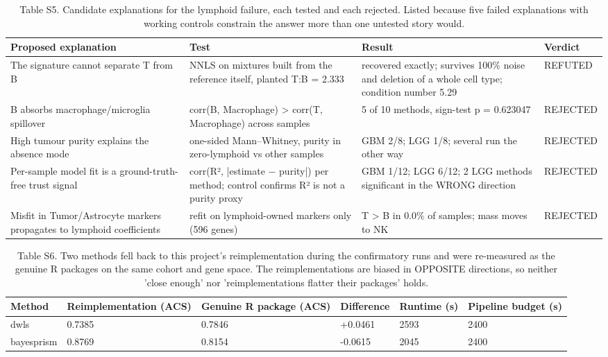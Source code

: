 \begin{table}[htbp]
\centering
\small
\caption{Table S5. Candidate explanations for the lymphoid failure, each tested and each rejected. Listed because five failed explanations with working controls constrain the answer more than one untested story would.}
\label{tab:S5_rejected_mechanisms}
\begin{tabular}{llll}
\toprule
\textbf{Proposed explanation} & \textbf{Test} & \textbf{Result} & \textbf{Verdict} \\
\midrule
The signature cannot separate T from B & NNLS on mixtures built from the reference itself, planted T:B = 2.333 & recovered exactly; survives 100\% noise and deletion of a whole cell type; condition number 5.29 & REFUTED \\
B absorbs macrophage/microglia spillover & corr(B, Macrophage) > corr(T, Macrophage) across samples & 5 of 10 methods, sign-test p = 0.623047 & REJECTED \\
High tumour purity explains the absence mode & one-sided Mann–Whitney, purity in zero-lymphoid vs other samples & GBM 2/8; LGG 1/8; several run the other way & REJECTED \\
Per-sample model fit is a ground-truth-free trust signal & corr(R², |estimate − purity|) per method; control confirms R² is not a purity proxy & GBM 1/12; LGG 6/12; 2 LGG methods significant in the WRONG direction & REJECTED \\
Misfit in Tumor/Astrocyte markers propagates to lymphoid coefficients & refit on lymphoid-owned markers only (596 genes) & T > B in 0.0\% of samples; mass moves to NK & REJECTED \\
\bottomrule
\end{tabular}
\end{table}

\begin{table}[htbp]
\centering
\small
\caption{Table S6. Two methods fell back to this project's reimplementation during the confirmatory runs and were re-measured as the genuine R packages on the same cohort and gene space. The reimplementations are biased in OPPOSITE directions, so neither 'close enough' nor 'reimplementations flatter their packages' holds.}
\label{tab:S6_genuine_vs_reimplementation}
\begin{tabular}{llllll}
\toprule
\textbf{Method} & \textbf{Reimplementation (ACS)} & \textbf{Genuine R package (ACS)} & \textbf{Difference} & \textbf{Runtime (s)} & \textbf{Pipeline budget (s)} \\
\midrule
dwls & 0.7385 & 0.7846 & +0.0461 & 2593 & 2400 \\
bayesprism & 0.8769 & 0.8154 & -0.0615 & 2045 & 2400 \\
\bottomrule
\end{tabular}
\end{table}

